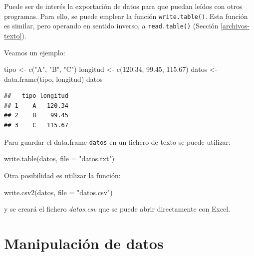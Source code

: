 \documentclass[
]{book}
\newenvironment{Shaded}{\begin{snugshade}}{\end{snugshade}}
\newcommand{\AttributeTok}[1]{\textcolor[rgb]{0.77,0.63,0.00}{#1}}
\newcommand{\FloatTok}[1]{\textcolor[rgb]{0.00,0.00,0.81}{#1}}
\newcommand{\FunctionTok}[1]{\textcolor[rgb]{0.00,0.00,0.00}{#1}}
\newcommand{\NormalTok}[1]{#1}
\newcommand{\OtherTok}[1]{\textcolor[rgb]{0.56,0.35,0.01}{#1}}
\newcommand{\StringTok}[1]{\textcolor[rgb]{0.31,0.60,0.02}{#1}}
\theoremstyle{break}
\theoremstyle{nonumberplain}
\begin{document}
Puede ser de interés la exportación de datos para que puedan leídos con otros programas.
Para ello, se puede emplear la función \texttt{write.table()}.
Esta función es similar, pero operando en sentido inverso, a \texttt{read.table()} (Sección \ref{archivos-texto}).

Veamos un ejemplo:

\begin{Shaded}
\begin{Highlighting}[]
\NormalTok{tipo }\OtherTok{\textless{}{-}} \FunctionTok{c}\NormalTok{(}\StringTok{"A"}\NormalTok{, }\StringTok{"B"}\NormalTok{, }\StringTok{"C"}\NormalTok{)}
\NormalTok{longitud }\OtherTok{\textless{}{-}} \FunctionTok{c}\NormalTok{(}\FloatTok{120.34}\NormalTok{, }\FloatTok{99.45}\NormalTok{, }\FloatTok{115.67}\NormalTok{)}
\NormalTok{datos }\OtherTok{\textless{}{-}} \FunctionTok{data.frame}\NormalTok{(tipo, longitud)}
\NormalTok{datos}
\end{Highlighting}
\end{Shaded}

\begin{verbatim}
##   tipo longitud
## 1    A   120.34
## 2    B    99.45
## 3    C   115.67
\end{verbatim}

Para guardar el data.frame \texttt{datos} en un fichero de texto se
puede utilizar:

\begin{Shaded}
\begin{Highlighting}[]
\FunctionTok{write.table}\NormalTok{(datos, }\AttributeTok{file =} \StringTok{"datos.txt"}\NormalTok{)}
\end{Highlighting}
\end{Shaded}

Otra posibilidad es utilizar la función:

\begin{Shaded}
\begin{Highlighting}[]
\FunctionTok{write.csv2}\NormalTok{(datos, }\AttributeTok{file =} \StringTok{"datos.csv"}\NormalTok{)}
\end{Highlighting}
\end{Shaded}

y se creará el fichero \emph{datos.csv} que se puede abrir directamente con Excel.

\hypertarget{manipulacion-datos}{%
\section{Manipulación de datos}\label{manipulacion-datos}}
\end{document}
